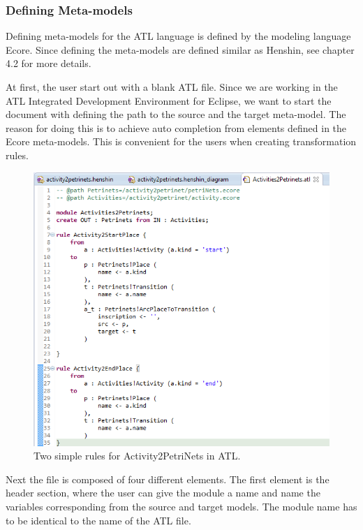 \subsubsection*{Defining Meta-models}

Defining meta-models for the ATL language is defined by the modeling language
Ecore. Since defining the meta-models are defined similar as Henshin, see
chapter 4.2 for more details. 

At first, the user start out with a blank ATL file. Since we are working in
the ATL Integrated Development Environment for Eclipse, we want to start the
document with defining the path to the source and the target meta-model. The
reason for doing this is to achieve auto completion from elements defined in the
Ecore meta-models. This is convenient for the users when creating transformation
rules.  

\begin{figure}[H]
	\centering
	\includegraphics[scale=0.5]{figures/ATLScreen.png}
	\caption[Simple rules for ATL]
	{Two simple rules for Activity2PetriNets in ATL.}
	\label{fig:ATL_Screen}
\end{figure}

Next the file is composed of four different elements. The first element is the
header section, where the user can give the module a name and name the variables
corresponding from the source and target models. The module name has to be
identical to the name of the ATL file.

